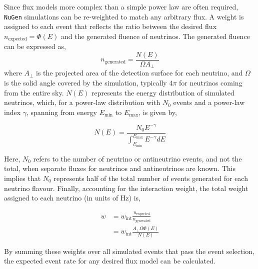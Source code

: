 Since flux models more complex than a simple power law are often required, \texttt{NuGen} simulations can be re-weighted to match any arbitrary flux. A weight is assigned to each event that reflects the ratio between the desired flux $n_{\mathrm{expected}} = \Phi(E) $ and the generated fluence of neutrinos. The generated fluence can be expressed as,
\begin{equation}
    n_{\mathrm{generated}} = \frac{N(E)}{\Omega A_\perp}
\end{equation}
where $A_\perp$ is the projected area of the detection surface for each neutrino, and $\Omega$ is the solid angle covered by the simulation, typically $4\pi$ for neutrinos coming from the entire sky. $N(E)$ represents the energy distribution of simulated neutrinos, which, for a power-law distribution with $N_0$ events and a power-law index $\gamma$, spanning from energy $E_{\text{min}}$ to $E_{\text{max}}$, is given by,

\begin{equation}
    N(E) = \frac{N_0 E^{-\gamma}} {\int_{E_{\text{min}}}^{E_{\text{max}}} E^{-\gamma} dE}
\end{equation}

Here, $N_0$ refers to the number of neutrino or antineutrino events, and not the total, when separate fluxes for neutrinos and antineutrinos are known. This implies that $N_0$ represents half of the total number of events generated for each neutrino flavour. Finally, accounting for the interaction weight, the total weight assigned to each neutrino (in units of Hz) is,

\begin{equation}
    \begin{split}
        w &= w_{\text{int}} \frac{n_{\mathrm{expected}}}{n_{\mathrm{generated}}}\\
           &= w_{\text{int}} \frac{A_\perp \Omega \Phi(E)}{N(E)}
    \end{split}
\end{equation}

By summing these weights over all simulated events that pass the event selection, the expected event rate for any desired flux model can be calculated.

